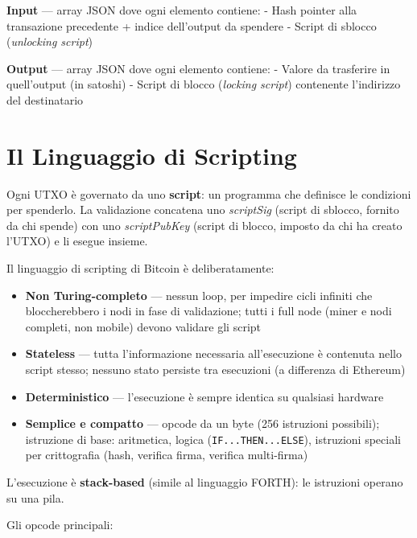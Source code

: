 \documentclass[
  italian,
  openany]{book}
\providecommand{\tightlist}{%
  \setlength{\itemsep}{0pt}\setlength{\parskip}{0pt}}
\begin{document}
\textbf{Input} --- array JSON dove ogni elemento contiene: - Hash
pointer alla transazione precedente + indice dell'output da spendere -
Script di sblocco (\emph{unlocking script})

\textbf{Output} --- array JSON dove ogni elemento contiene: - Valore da
trasferire in quell'output (in satoshi) - Script di blocco
(\emph{locking script}) contenente l'indirizzo del destinatario

\section{Il Linguaggio di Scripting}\label{il-linguaggio-di-scripting}

Ogni UTXO è governato da uno \textbf{script}: un programma che definisce
le condizioni per spenderlo. La validazione concatena uno
\emph{scriptSig} (script di sblocco, fornito da chi spende) con uno
\emph{scriptPubKey} (script di blocco, imposto da chi ha creato l'UTXO)
e li esegue insieme.

Il linguaggio di scripting di Bitcoin è deliberatamente:

\begin{itemize}
\tightlist
\item
  \textbf{Non Turing-completo} --- nessun loop, per impedire cicli
  infiniti che bloccherebbero i nodi in fase di validazione; tutti i
  full node (miner e nodi completi, non mobile) devono validare gli
  script
\item
  \textbf{Stateless} --- tutta l'informazione necessaria all'esecuzione
  è contenuta nello script stesso; nessuno stato persiste tra esecuzioni
  (a differenza di Ethereum)
\item
  \textbf{Deterministico} --- l'esecuzione è sempre identica su
  qualsiasi hardware
\item
  \textbf{Semplice e compatto} --- opcode da un byte (256 istruzioni
  possibili); istruzione di base: aritmetica, logica
  (\texttt{IF...THEN...ELSE}), istruzioni speciali per crittografia
  (hash, verifica firma, verifica multi-firma)
\end{itemize}

L'esecuzione è \textbf{stack-based} (simile al linguaggio FORTH): le
istruzioni operano su una pila.

Gli opcode principali:
\end{document}
